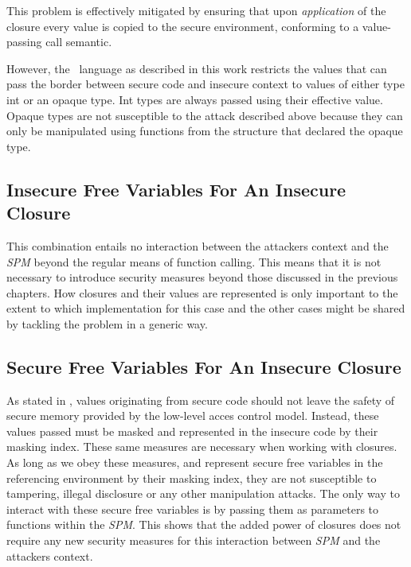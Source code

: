 This problem is effectively mitigated by ensuring that upon \emph{application} of the closure every value is copied to the secure environment, conforming to a value-passing call semantic.

However, the \MiniML\ language as described in this work restricts the values that can pass the border between secure code and insecure context to values of either type int or an opaque  type.
Int types are always passed using their effective value.
Opaque types are not susceptible to the attack described above because they can only be manipulated using functions from the structure that declared the opaque type.




\subsection{Insecure Free Variables For An Insecure Closure}

This combination entails no interaction between the attackers context and the \emph{SPM} beyond the regular means of function calling.
This means that it is not necessary to introduce security measures beyond those discussed in the previous chapters.
How closures and their values are represented is only important to the extent to which implementation for this case and the other cases might be shared by tackling the problem in a generic way.

\subsection{Secure Free Variables For An Insecure Closure}

As stated in , values originating from secure code should not leave the safety of secure memory provided by the low-level acces control model.
Instead, these values passed must be masked and represented in the insecure code by their masking index.
These same measures are necessary when working with closures.
As long as we obey these measures, and represent secure free variables in the referencing environment by their masking index, they are not susceptible to tampering, illegal disclosure or any other manipulation attacks.
The only way to interact with these secure free variables is by passing them as parameters to functions within the \emph{SPM}.
This shows that the added power of closures does not require any new security measures for this interaction between \emph{SPM} and the attackers context.

